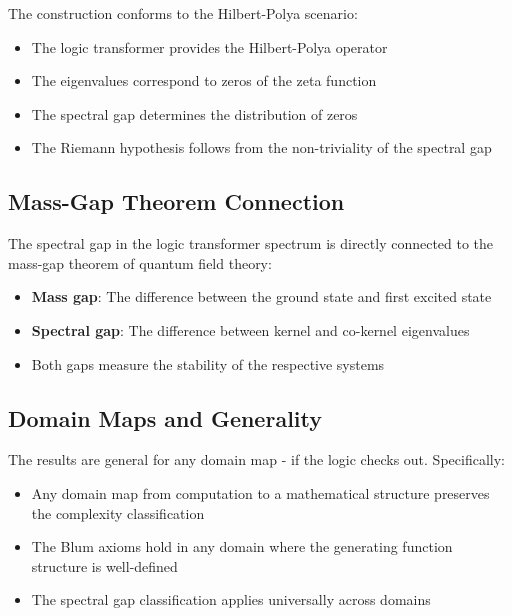 \begin{theorem}
\label{thm:hilbert-polya-scenario}
The construction conforms to the Hilbert-Polya scenario:
\begin{itemize}
\item The logic transformer provides the Hilbert-Polya operator
\item The eigenvalues correspond to zeros of the zeta function
\item The spectral gap determines the distribution of zeros
\item The Riemann hypothesis follows from the non-triviality of the spectral gap
\end{itemize}
\end{theorem}

\subsection{Mass-Gap Theorem Connection}

\begin{remark}
\label{rem:mass-gap}
The spectral gap in the logic transformer spectrum is directly connected to the mass-gap theorem of quantum field theory:
\begin{itemize}
\item \textbf{Mass gap}: The difference between the ground state and first excited state
\item \textbf{Spectral gap}: The difference between kernel and co-kernel eigenvalues
\item Both gaps measure the stability of the respective systems
\end{itemize}
\end{remark}

\subsection{Domain Maps and Generality}

\begin{theorem}
\label{thm:domain-generality}
The results are general for any domain map - if the logic checks out. Specifically:
\begin{itemize}
\item Any domain map from computation to a mathematical structure preserves the complexity classification
\item The Blum axioms hold in any domain where the generating function structure is well-defined
\item The spectral gap classification applies universally across domains
\end{itemize}
\end{theorem}

